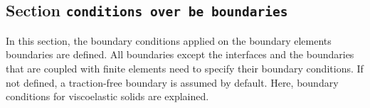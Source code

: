 \documentclass[a4paper,fleqn]{book}
\begin{document}
% 
% 
% 
% 
% 
% 
% 

\subsection{Section \texttt{conditions over be boundaries}}
\label{sec:conditions_be_boundaries}

In this section, the boundary conditions applied on the boundary elements boundaries are defined. All boundaries except the interfaces and the boundaries that are coupled with finite elements need to specify their boundary conditions. If not defined, a traction-free boundary is assumed by default. Here, boundary conditions for viscoelastic solids are explained.
\end{document}
